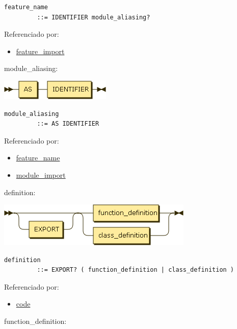 \begin{verbatim}
feature_name
         ::= IDENTIFIER module_aliasing?
\end{verbatim}

Referenciado por:

\begin{itemize}
\tightlist
\item
  \protect\hyperlink{feature_import}{feature\_import}
\end{itemize}

\protect\hypertarget{module_aliasing}{}{module\_aliasing:}

\includegraphics[width=2.08333in,height=0.37500in]{diagram/module_aliasing.png}

\begin{verbatim}
module_aliasing
         ::= AS IDENTIFIER
\end{verbatim}

Referenciado por:

\begin{itemize}
\tightlist
\item
  \protect\hyperlink{feature_name}{feature\_name}
\item
  \protect\hyperlink{module_import}{module\_import}
\end{itemize}

\protect\hypertarget{definition}{}{definition:}

\includegraphics[width=3.66667in,height=0.83333in]{diagram/definition.png}

\begin{verbatim}
definition
         ::= EXPORT? ( function_definition | class_definition )
\end{verbatim}

Referenciado por:

\begin{itemize}
\tightlist
\item
  \protect\hyperlink{code}{code}
\end{itemize}

\protect\hypertarget{function_definition}{}{function\_definition:}

